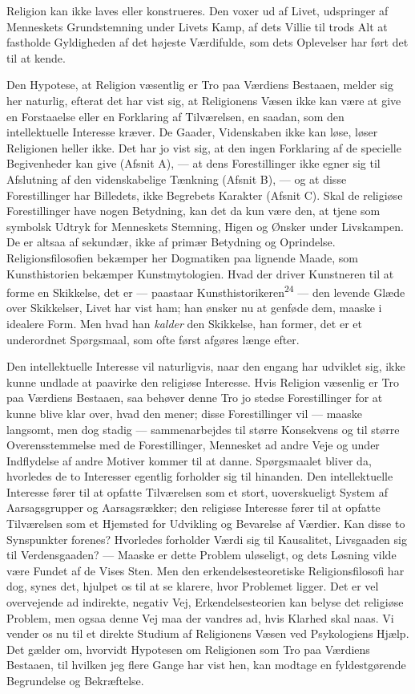 \documentclass[12pt,a4paper,openany]{book}
\newcommand{\opage}[1]{\marginnote{\footnotesize\textit{[#1]}}}
\begin{document}
Religion kan ikke laves eller konstrueres. Den voxer ud af Livet,
udspringer af Menneskets Grundstemning under Livets Kamp, af dets Villie
til trods Alt at fastholde Gyldigheden af det højeste Værdifulde, som
dets Oplevelser har ført det til at kende.

Den Hypotese, at Religion væsentlig er Tro paa Værdiens Bestaaen, melder
sig her naturlig, efterat det har vist sig, at Religionens Væsen ikke
kan være at give en Forstaaelse eller en Forklaring af Tilværelsen, en
saadan, som den intellektuelle Interesse kræver. De Gaader, Videnskaben
ikke kan løse, løser Religionen heller ikke. Det har jo vist sig, at den
ingen Forklaring af de specielle Begivenheder kan give (Afsnit A), ---
at dens Forestillinger ikke egner sig til Afslutning af den
videnskabelige Tænkning (Afsnit B), --- og at disse Forestillinger har
Billedets, ikke Begrebets Karakter (Afsnit C). Skal de religiøse
Forestillinger have nogen Betydning, kan det da kun være den, at tjene
som symbolsk Udtryk for Menneskets Stemning, Higen og Ønsker under
Livskampen. De er altsaa af sekundær, ikke af primær Betydning og
Oprindelse. Religionsfilosofien bekæmper her Dogmatiken paa lignende
Maade, som Kunsthistorien bekæmper Kunstmytologien. Hvad der driver
Kunstneren til at forme en Skikkelse, det er --- paastaar
Kunsthistorikeren\textsuperscript{24} --- den levende Glæde over
Skikkelser, Livet har vist ham; han ønsker nu at genføde dem, maaske i
idealere Form. Men hvad han \textit{kalder} den Skikkelse, han former,
det er et underordnet Spørgsmaal, som ofte først afgøres længe efter.

Den intellektuelle Interesse vil naturligvis, naar den engang har
udviklet sig, ikke kunne undlade at paavirke den religiøse Interesse.
Hvis Religion væsenlig er Tro paa Værdiens Bestaaen, saa behøver denne
Tro jo stedse Forestillinger for at kunne blive klar over, hvad den
mener; disse Forestillinger vil --- maaske langsomt, men dog stadig ---
sammenarbejdes til større Konsekvens og til større Overensstemmelse med
de Forestillinger, Mennesket ad andre Veje og under Indflydelse af andre
Motiver kommer til at danne. Spørgsmaalet bliver da, hvorledes de to
Interesser egentlig forholder sig til hinanden. Den intellektuelle
Interesse fører til at opfatte Tilværelsen som et stort, uoverskueligt
\opage{50}System af Aarsagsgrupper og Aarsagsrækker; den religiøse
Interesse fører til at opfatte Tilværelsen som et Hjemsted for Udvikling
og Bevarelse af Værdier. Kan disse to Synspunkter forenes? Hvorledes
forholder Værdi sig til Kausalitet, Livsgaaden sig til Verdensgaaden?
--- Maaske er dette Problem uløseligt, og dets Løsning vilde være Fundet
af de Vises Sten. Men den erkendelsesteoretiske Religionsfilosofi har
dog, synes det, hjulpet os til at se klarere, hvor Problemet ligger. Det
er vel overvejende ad indirekte, negativ Vej, Erkendelsesteorien kan
belyse det religiøse Problem, men ogsaa denne Vej maa der vandres ad,
hvis Klarhed skal naas. Vi vender os nu til et direkte Studium af
Religionens Væsen ved Psykologiens Hjælp. Det gælder om, hvorvidt
Hypotesen om Religionen som Tro paa Værdiens Bestaaen, til hvilken jeg
flere Gange har vist hen, kan modtage en fyldestgørende Begrundelse og
Bekræftelse.
\end{document}
